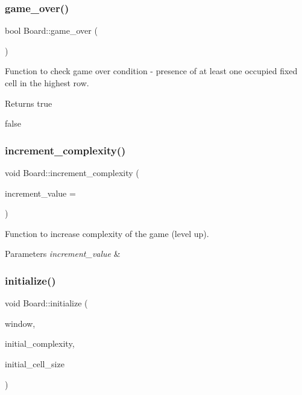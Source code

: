 \subsubsection{\texorpdfstring{game\+\_\+over()}{game\_over()}}
{\footnotesize\ttfamily bool Board\+::game\+\_\+over (\begin{DoxyParamCaption}{ }\end{DoxyParamCaption})}



Function to check game over condition -\/ presence of at least one occupied fixed cell in the highest row. 

\begin{DoxyReturn}{Returns}
true 

false 
\end{DoxyReturn}
\mbox{\label{classBoard_a60b57f74ba288cdb9131b7ddb4f801b9}} 
\subsubsection{\texorpdfstring{increment\+\_\+complexity()}{increment\_complexity()}}
{\footnotesize\ttfamily void Board\+::increment\+\_\+complexity (\begin{DoxyParamCaption}\item[{const int \&}]{increment\+\_\+value = {} }\end{DoxyParamCaption})}



Function to increase complexity of the game (level up). 


\begin{DoxyParams}{Parameters}
{\em increment\+\_\+value} & \\
\hline
\end{DoxyParams}
\mbox{\label{classBoard_a2a65a2e04ad3cb7c8712ed8ae9c89d3b}} 
\subsubsection{\texorpdfstring{initialize()}{initialize()}}
{\footnotesize\ttfamily void Board\+::initialize (\begin{DoxyParamCaption}\item[{Render\+Window \&}]{window,  }\item[{const unsigned \&}]{initial\+\_\+complexity,  }\item[{const Vector2f \&}]{initial\+\_\+cell\+\_\+size }\end{DoxyParamCaption})}



